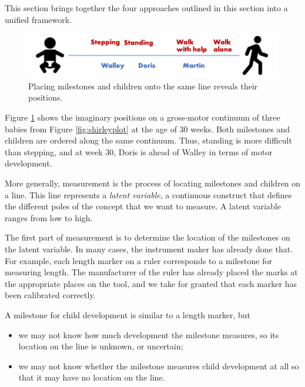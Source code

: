 \documentclass[
]{book}
\providecommand{\tightlist}{%
  \setlength{\itemsep}{0pt}\setlength{\parskip}{0pt}}
\begin{document}
This section brings together the four approaches outlined in this section into a unified framework.

\begin{figure}

{\centering \includegraphics[width=1\linewidth]{fig/lineplot} 

}

\caption{Placing milestones and children onto the same line reveals their positions.}\label{fig:lineplot}
\end{figure}



Figure \ref{fig:lineplot} shows the imaginary positions on a gross-motor continuum of three babies from Figure \ref{fig:shirleyplot} at the age of 30 weeks. Both milestones and children are ordered along the same continuum. Thus, standing is more difficult than stepping, and at week 30, Doris is ahead of Walley in terms of motor development.

More generally, measurement is the process of locating milestones and children on a line. This line represents a \emph{latent variable}, a continuous construct that defines the different poles of the concept that we want to measure. A latent variable ranges from low to high.

The first part of measurement is to determine the location of the milestones on the latent variable. In many cases, the instrument maker has already done that. For example, each length marker on a ruler corresponds to a milestone for measuring length. The manufacturer of the ruler has already placed the marks at the appropriate places on the tool, and we take for granted that each marker has been calibrated correctly.

A milestone for child development is similar to a length marker, but

\begin{itemize}
\tightlist
\item
  we may not know how much development the milestone measures, so its location on the line is unknown, or uncertain;
\item
  we may not know whether the milestone measures child development at all so that it may have no location on the line.
\end{itemize}
\end{document}
